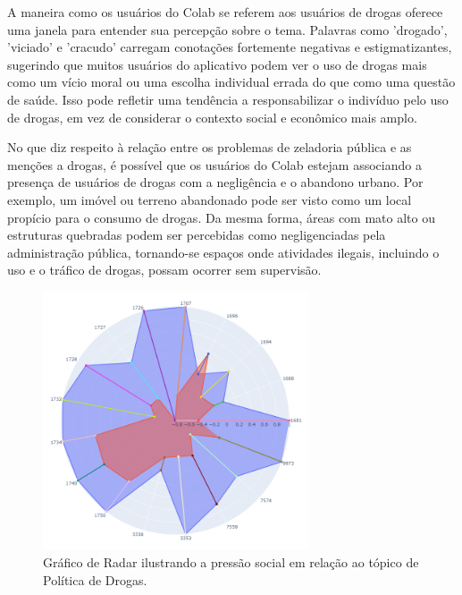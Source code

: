 A maneira como os usuários do Colab se referem aos usuários de drogas oferece uma janela para entender sua percepção sobre o tema. Palavras como 'drogado', 'viciado' e 'cracudo' carregam conotações fortemente negativas e estigmatizantes, sugerindo que muitos usuários do aplicativo podem ver o uso de drogas mais como um vício moral ou uma escolha individual errada do que como uma questão de saúde. Isso pode refletir uma tendência a responsabilizar o indivíduo pelo uso de drogas, em vez de considerar o contexto social e econômico mais amplo.

No que diz respeito à relação entre os problemas de zeladoria pública e as menções a drogas, é possível que os usuários do Colab estejam associando a presença de usuários de drogas com a negligência e o abandono urbano. Por exemplo, um imóvel ou terreno abandonado pode ser visto como um local propício para o consumo de drogas. Da mesma forma, áreas com mato alto ou estruturas quebradas podem ser percebidas como negligenciadas pela administração pública, tornando-se espaços onde atividades ilegais, incluindo o uso e o tráfico de drogas, possam ocorrer sem supervisão.

\begin{figure}[htb]
	\centering
	\includegraphics[width=0.7\textwidth]{images/social_barometer_drugs.png}
	\caption{Gráfico de Radar ilustrando a pressão social em relação ao tópico de Política de Drogas.}
	\label{fig:social_barometer_drugs}
\end{figure}

